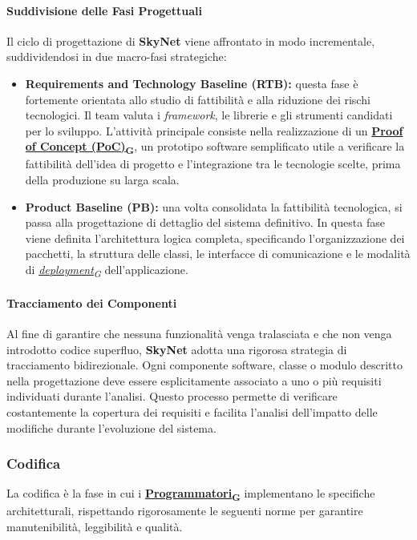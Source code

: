 \documentclass[12pt, a4paper]{article}
\newcommand{\urlglossario}{https://skynetunigroup.github.io/Code_Guardian/Documentazione/PB/glossario_v2.0.0.pdf} %
\newcommand{\glo}[2]{\href{\urlglossario\#nameddest=#2}{#1\textsubscript{G}}}
\begin{document}
\paragraph{Suddivisione delle Fasi Progettuali}
Il ciclo di progettazione di \textbf{SkyNet} viene affrontato in modo incrementale, suddividendosi in due macro-fasi strategiche:
\begin{itemize}
    \item \textbf{Requirements and Technology Baseline (RTB):} questa fase è fortemente orientata allo studio di fattibilità e alla riduzione dei rischi tecnologici. Il team valuta i \textit{framework}, le librerie e gli strumenti candidati per lo sviluppo. L'attività principale consiste nella realizzazione di un \textbf{\glo{Proof of Concept (PoC)}{poc}}, un prototipo software semplificato utile a verificare la fattibilità dell'idea di progetto e l'integrazione tra le tecnologie scelte, prima della produzione su larga scala.
    \item \textbf{Product Baseline (PB):} una volta consolidata la fattibilità tecnologica, si passa alla progettazione di dettaglio del sistema definitivo. In questa fase viene definita l'architettura logica completa, specificando l'organizzazione dei pacchetti, la struttura delle classi, le interfacce di comunicazione e le modalità di \textit{\glo{deployment}{deployment}} dell'applicazione.
\end{itemize}

\paragraph{Tracciamento dei Componenti}
Al fine di garantire che nessuna funzionalità venga tralasciata e che non venga introdotto codice superfluo, \textbf{SkyNet} adotta una rigorosa strategia di tracciamento bidirezionale. Ogni componente software, classe o modulo descritto nella progettazione deve essere esplicitamente associato a uno o più requisiti individuati durante l'analisi. Questo processo permette di verificare costantemente la copertura dei requisiti e facilita l'analisi dell'impatto delle modifiche durante l'evoluzione del sistema.

\subsubsection{Codifica}
La codifica è la fase in cui i \textbf{\glo{Programmatori}{programmatore}} implementano le specifiche architetturali, rispettando rigorosamente le seguenti norme per garantire manutenibilità, leggibilità e qualità.
\end{document}
